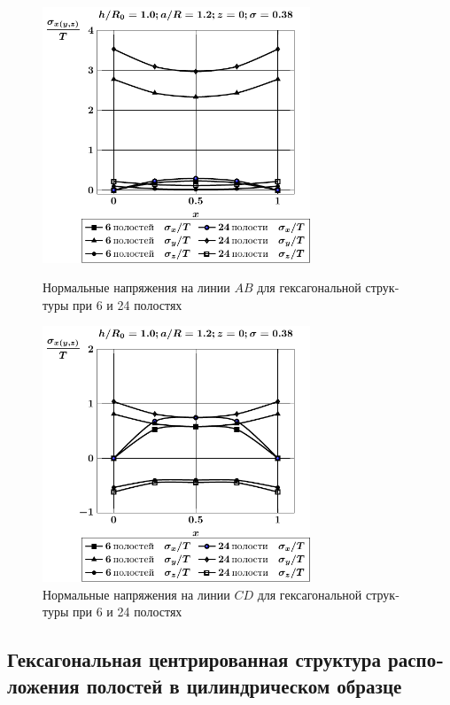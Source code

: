 \begin{russian}
\begin{figure}[h!]
\centering\footnotesize
\parbox[b]{7.5cm}{\centering\includegraphics[width=8cm]{cav24-6-a12-h10-r10-z0.pdf}
\caption{Нормальные напряжения на линии $AB$ для гексагональной структуры при 6 и 24 полостях
\label{f:7:132}}}\hfil\hfil
\parbox[b]{7.5cm}{\centering\includegraphics[width=8cm]{cav24-6-a12-h10-r10-z0-diag.pdf}
\caption{Нормальные напряжения на линии $CD$ для гексагональной структуры при 6 и 24 полостях
\label{f:7:133}}}
\end{figure}

\subsection{Гексагональная центрированная структура расположения полостей в цилиндрическом образце}


\end{russian}
